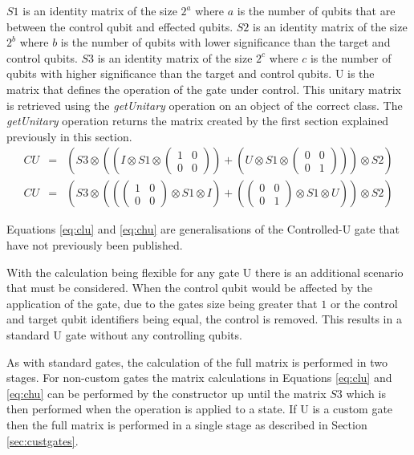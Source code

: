 $S1$ is an identity matrix of the size $2^a$ where $a$ is the number of qubits that are between the control qubit and effected qubits.
$S2$ is an identity matrix of the size $2^b$ where $b$ is the number of qubits with lower significance than the target and control qubits.
$S3$ is an identity matrix of the size $2^c$ where $c$ is the number of qubits with higher significance than the target and control qubits.
U is the matrix that defines the operation of the gate under control.
This unitary matrix is retrieved using the \emph{getUnitary} operation on an object of the correct class.
The \emph{getUnitary} operation returns the matrix created by the first section explained previously in this section.
\begin{eqnarray}
\label{eq:clu}
 CU&=& (S3 \otimes ((I\otimes S1\otimes\begin{pmatrix}1&0\\0&0\end{pmatrix})+(U\otimes S1\otimes\begin{pmatrix}0&0\\0&1\end{pmatrix})) \otimes S2) \\
\label{eq:chu}
 CU&=& (S3 \otimes ((\begin{pmatrix}1&0\\0&0\end{pmatrix}\otimes S1\otimes I)+(\begin{pmatrix}0&0\\0&1\end{pmatrix}\otimes S1\otimes U)) \otimes S2)
\end{eqnarray}

Equations \ref{eq:clu} and \ref{eq:chu} are generalisations of the Controlled-U gate that have not previously been published.

With the calculation being flexible for any gate U there is an additional  scenario that must be considered.
When the control qubit would be affected by the application of the gate, due to the gates size being greater that $1$ or the control and target qubit identifiers being equal, the control is removed.
This results in a standard U gate without any controlling qubits.

As with standard gates, the calculation of the full matrix is performed in two stages.
For non-custom gates the matrix calculations in Equations \ref{eq:clu} and \ref{eq:chu} can be performed by the constructor up until the matrix $S3$ which is then performed when the operation is applied to a state.
If U is a custom gate then the full matrix is performed in a single stage as described in Section \ref{sec:custgates}.

